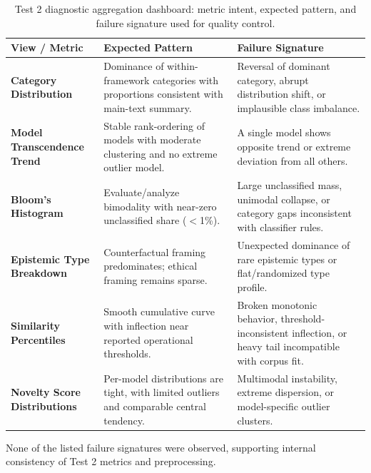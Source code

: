 \begin{table}[htbp]
  \centering
  \begin{footnotesize}
  \caption{Test 2 diagnostic aggregation dashboard: metric intent, expected pattern, and failure signature used for quality control.}
  \label{tab:t2_diagnostic_dashboard}
  \begin{threeparttable}
  \begin{tabularx}{\textwidth}{@{}>{\raggedright\arraybackslash\bfseries}p{3.2cm} Y Y@{}}
    \toprule
    \textbf{View / Metric} & \textbf{Expected Pattern} & \textbf{Failure Signature} \\
    \midrule
    Category Distribution & Dominance of within-framework categories with proportions consistent with main-text summary. & Reversal of dominant category, abrupt distribution shift, or implausible class imbalance. \\
    Model Transcendence Trend & Stable rank-ordering of models with moderate clustering and no extreme outlier model. & A single model shows opposite trend or extreme deviation from all others. \\
    Bloom's Histogram & Evaluate/analyze bimodality with near-zero unclassified share ($<$1\%). & Large unclassified mass, unimodal collapse, or category gaps inconsistent with classifier rules. \\
    Epistemic Type Breakdown & Counterfactual framing predominates; ethical framing remains sparse. & Unexpected dominance of rare epistemic types or flat/randomized type profile. \\
    Similarity Percentiles & Smooth cumulative curve with inflection near reported operational thresholds. & Broken monotonic behavior, threshold-inconsistent inflection, or heavy tail incompatible with corpus fit. \\
    Novelty Score Distributions & Per-model distributions are tight, with limited outliers and comparable central tendency. & Multimodal instability, extreme dispersion, or model-specific outlier clusters. \\
    \bottomrule
  \end{tabularx}
  \begin{tablenotes}
    \item None of the listed failure signatures were observed, supporting internal consistency of Test 2 metrics and preprocessing.
  \end{tablenotes}
  \end{threeparttable}
  \end{footnotesize}
\end{table}

